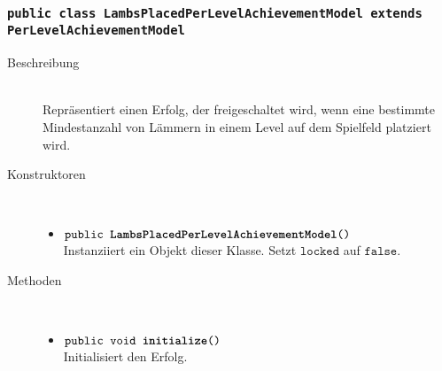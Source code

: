 \subsubsection{\normalfont \texttt{public class \textbf{LambsPlacedPerLevelAchievementModel} extends PerLevelAchievementModel}}

\begin{description}
\item[Beschreibung] \hfill \\ Repräsentiert einen Erfolg, der freigeschaltet wird, wenn eine bestimmte Mindestanzahl von Lämmern in einem Level auf dem Spielfeld platziert wird.
	
\item[Konstruktoren] \hfill \\
	\vspace{-.8cm}
	\begin{itemize}
		\item $\texttt{public \textbf{LambsPlacedPerLevelAchievementModel}()}$ \\ Instanziiert ein Objekt dieser Klasse. Setzt $\texttt{locked}$ auf $\texttt{false}$.
	\end{itemize}
	
\item[Methoden] \hfill \\
	\vspace{-.8cm}
	\begin{itemize}
				\item $\texttt{public void \textbf{initialize}()}$ \\ Initialisiert den Erfolg.
		

\end{itemize}
\end{description}
